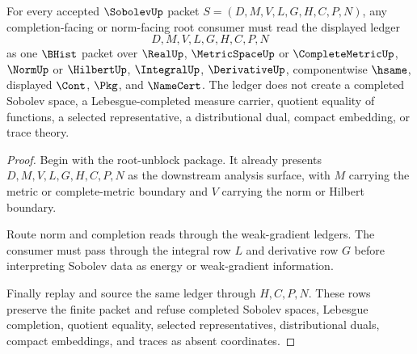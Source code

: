 \begin{theorem}
\label{thm:sobolev-root-norm-completion-ledger}
For every accepted $\SobolevUp$ packet $S=(D,M,V,L,G,H,C,P,N)$, any completion-facing or norm-facing root consumer must read the displayed ledger
$$
D,M,V,L,G,H,C,P,N
$$
as one $\BHist$ packet over $\RealUp$, $\MetricSpaceUp$ or $\CompleteMetricUp$, $\NormUp$ or $\HilbertUp$, $\IntegralUp$, $\DerivativeUp$, componentwise $\hsame$, displayed $\Cont$, $\Pkg$, and $\NameCert$. The ledger does not create a completed Sobolev space, a Lebesgue-completed measure carrier, quotient equality of functions, a selected representative, a distributional dual, compact embedding, or trace theory.
\end{theorem}
\begin{proof}
Begin with the root-unblock package. It already presents $D,M,V,L,G,H,C,P,N$ as the downstream analysis surface, with $M$ carrying the metric or complete-metric boundary and $V$ carrying the norm or Hilbert boundary.

Route norm and completion reads through the weak-gradient ledgers. The consumer must pass through the integral row $L$ and derivative row $G$ before interpreting Sobolev data as energy or weak-gradient information.

Finally replay and source the same ledger through $H,C,P,N$. These rows preserve the finite packet and refuse completed Sobolev spaces, Lebesgue completion, quotient equality, selected representatives, distributional duals, compact embeddings, and traces as absent coordinates.
\end{proof}

